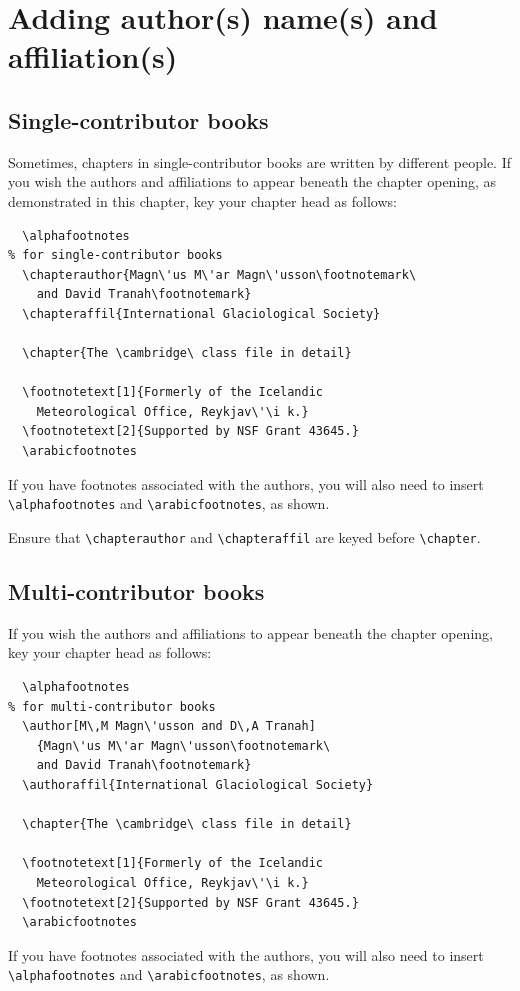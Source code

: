 \section{Adding author(s) name(s) and affiliation(s)}

\subsection{Single-contributor books}

Sometimes, chapters in single-contributor books are written by different people. If you wish the authors and affiliations to appear beneath the chapter opening, as demonstrated in this chapter, key your chapter head as follows:
\begin{verbatim}
  \alphafootnotes
% for single-contributor books
  \chapterauthor{Magn\'us M\'ar Magn\'usson\footnotemark\
    and David Tranah\footnotemark}
  \chapteraffil{International Glaciological Society}

  \chapter{The \cambridge\ class file in detail}

  \footnotetext[1]{Formerly of the Icelandic
    Meteorological Office, Reykjav\'\i k.}
  \footnotetext[2]{Supported by NSF Grant 43645.}
  \arabicfootnotes
\end{verbatim}
If you have footnotes associated with the authors, you will also need to insert \verb"\alphafootnotes" and \verb"\arabicfootnotes", as shown.

Ensure that \verb"\chapterauthor" and \verb"\chapteraffil" are keyed before \verb"\chapter".


\subsection{Multi-contributor books}

If you wish the authors and affiliations to appear beneath the chapter opening, key your chapter head as follows:
\begin{verbatim}
  \alphafootnotes
% for multi-contributor books
  \author[M\,M Magn\'usson and D\,A Tranah]
    {Magn\'us M\'ar Magn\'usson\footnotemark\
    and David Tranah\footnotemark}
  \authoraffil{International Glaciological Society}

  \chapter{The \cambridge\ class file in detail}

  \footnotetext[1]{Formerly of the Icelandic
    Meteorological Office, Reykjav\'\i k.}
  \footnotetext[2]{Supported by NSF Grant 43645.}
  \arabicfootnotes
\end{verbatim}
If you have footnotes associated with the authors, you will also need to insert \verb"\alphafootnotes" and \verb"\arabicfootnotes", as shown.

